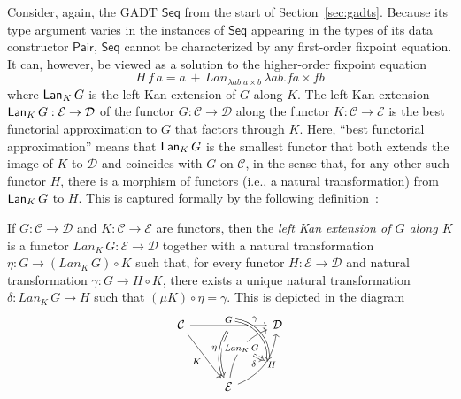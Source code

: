 \documentclass[acmsmall,screen,review,anonymous]{acmart}
\theoremstyle{definition}
\newcommand{\cal}{\mathcal}
\begin{document}
Consider, again, the GADT $\mathsf{Seq}$ from the start of
Section~\ref{sec:gadts}. Because its type argument varies in the
instances of $\mathsf{Seq}$ appearing in the types of its data
constructor $\mathsf{Pair}$, $\mathsf{Seq}$ cannot be characterized by
any first-order fixpoint equation. It can, however, be viewed as a
solution to the higher-order fixpoint equation
\[H\,f\,a = a \,+\,Lan_{\lambda a b. a \times b}\, \lambda
a b. f a \times f b\] where $\mathsf{Lan}_K \,G$ is the left Kan extension of
$G$ along $K$.  The left Kan extension $\Lan_K \,G : {\cal E} \to
{\cal D}$ of the functor $G : {\cal C} \to {\cal D}$ along the functor
$K : {\cal C} \to {\cal E}$ is the best functorial approximation to
$G$ that factors through $K$. Here, ``best functorial approximation''
means that $\mathsf{Lan}_K \,G$ is the smallest functor that both extends the
image of $K$ to $\cal D$ and coincides with $G$ on $\cal C$, in the
sense that, for any other such functor $H$, there is a morphism of
functors (i.e., a natural transformation) from $\mathsf{Lan}_K \,G$ to
$H$. This is captured formally by the following
definition~\cite{mac71}:
\begin{definition}\label{def:lke}
If $G : {\cal C} \to {\cal D}$ and $K : {\cal C} \to {\cal E}$ are
functors, then the {\em left Kan extension of $G$ along $K$} is a
functor $\mathit{Lan}_K\,G : {\cal E} \to {\cal D}$ together with a
natural transformation $\eta : G \to (\mathit{Lan}_K\,G) \circ K$
such that, for every functor $H : {\cal E} \to {\cal D}$ and natural
transformation $\gamma : G \to H \circ K$, there exists a unique
natural transformation $\delta : \mathit{Lan}_K\,G \to H$ such that $(\mu
K) \circ \eta = \gamma$. This is depicted in the diagram
\[\begin{tikzcd}[row sep = huge]
{\cal C}
\ar[rr, "{G}"{name=Fa, above}, ""{name=F, below}]
\ar[rd, "{K}"']
&& {\cal D} \\
& {\cal E}
\ar[Rightarrow, bend right = 25, from=F, "{\eta}"']
\ar[ur, bend left, "{\mathit{Lan}_{K}\,G}"{name=Lan, description}]
\ar[ur, bend right, "{H}"'{name=L, right}, ""'{name=Lr, right}]
\ar[Rightarrow, bend left = 45, from=Fa, to=Lr, "{\gamma}" near start]
\ar[Rightarrow, dashed, from=Lan, to=L, "{\delta}"']
\end{tikzcd}\]
\end{definition}
\end{document}
